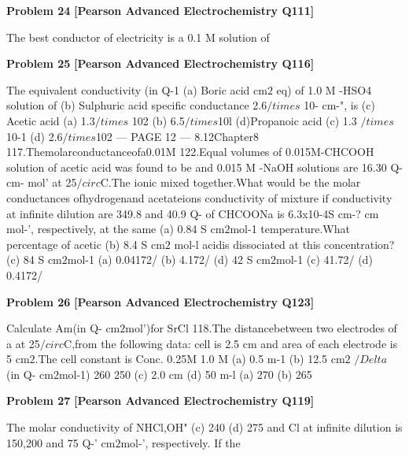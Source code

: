 \begin{problembox}
\textbf{Problem 24} \hfill \textbf{[Pearson Advanced Electrochemistry Q111]}
\label{q:ext-pearson-24}

The best conductor of electricity is a
0.1 M solution of
\end{problembox}

\begin{problembox}
\textbf{Problem 25} \hfill \textbf{[Pearson Advanced Electrochemistry Q116]}
\label{q:ext-pearson-25}

The equivalent conductivity (in Q-1
(a) Boric acid
cm$2$ eq) of 1.0 M -HSO4 solution of
(b) Sulphuric acid
specific conductance 2.6$/times$ 10-  cm-", is
(c) Acetic acid
(a) 1.3$/times$ 102
(b) 6.5$/times$10l
(d)Propanoic acid
(c) 1.3 $/times$ 10-1
(d) 2.6$/times$102
--- PAGE 12 ---
8.12Chapter8
117.Themolarconductanceofa0.01M
122.Equal volumes of 0.015M-CHCOOH
solution of acetic acid was found to be
and 0.015 M -NaOH solutions are
16.30 Q-  cm-  mol' at 25$/circ$C.The ionic
mixed together.What would be the molar
conductances ofhydrogenand acetateions
conductivity of mixture if conductivity
at infinite dilution are 349.8 and 40.9 Q-
of CHCOONa is 6.3x10-4S cm-?
cm mol-', respectively, at the same
(a) 0.84 S cm$2$mol-1
temperature.What percentage of acetic
(b) 8.4 S cm$2$ mol-l
acidis dissociated at this concentration?
(c) 84 S cm$2$mol-1
(a) 0.04172/%
(b) 4.172/%
(d) 42 S cm$2$mol-1
(c) 41.72/%
(d) 0.4172/%
\end{problembox}

\begin{problembox}
\textbf{Problem 26} \hfill \textbf{[Pearson Advanced Electrochemistry Q123]}
\label{q:ext-pearson-26}

Calculate Am(in Q-  cm$2$mol')for SrCl
118.The distancebetween two electrodes of a
at 25$/circ$C,from the following data:
cell is 2.5 cm and area of each electrode is
5 cm$2$.The cell constant is
Conc.
0.25M
1.0 M
(a) 0.5 m-1
(b) 12.5 cm$2$
$/Delta$ (in Q- cm$2$mol-1)
260
250
(c) 2.0 cm
(d) 50 m-l
(a) 270
(b) 265
\end{problembox}

\begin{problembox}
\textbf{Problem 27} \hfill \textbf{[Pearson Advanced Electrochemistry Q119]}
\label{q:ext-pearson-27}

The molar conductivity of NHCl,OH"
(c) 240
(d) 275
and Cl at infinite dilution is 150,200
and 75 Q-' cm$2$mol-', respectively. If the
\end{problembox}

